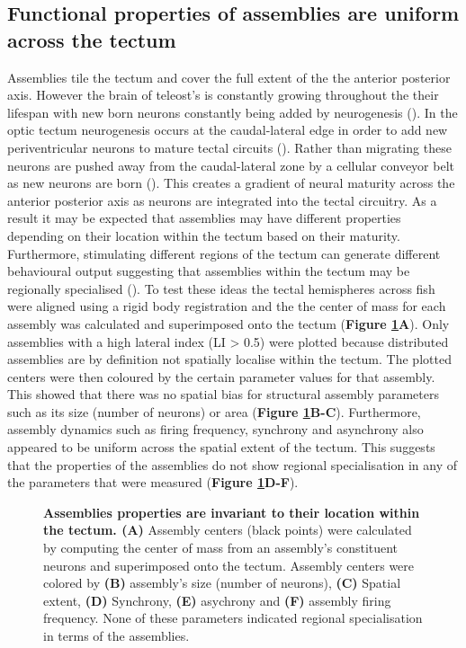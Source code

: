 \subsection{Functional properties of assemblies are uniform across the tectum}
Assemblies tile the tectum and cover the full extent of the the anterior posterior axis. However the brain of teleost's is constantly growing throughout the their lifespan with new born neurons constantly being added by neurogenesis (\cite{Boulanger-Weill2019}). In the optic tectum neurogenesis occurs at the caudal-lateral edge in order to add new periventricular neurons to mature tectal circuits (\cite{Schmidt2013NeurogenesisAdult}). Rather than migrating these neurons are pushed away from the caudal-lateral zone by a cellular conveyor belt as new neurons are born (\cite{Boulanger-Weill2017}). This creates a gradient of neural maturity across the anterior posterior axis as neurons are integrated into the tectal circuitry. As a result it may be expected that assemblies may have different properties depending on their location within the tectum based on their maturity. Furthermore, stimulating different regions of the tectum can generate different behavioural output suggesting that assemblies within the tectum may be regionally specialised (\cite{Helmbrecht2018}). To test these ideas the tectal hemispheres across fish were aligned using a rigid body registration and the the center of mass for each assembly was calculated and superimposed onto the tectum (\textbf{Figure \ref{fig:R1_F7}A}).  Only assemblies with a high lateral index (LI > 0.5) were plotted because distributed assemblies are by definition not spatially localise within the tectum. The plotted centers were then coloured by the certain parameter values for that assembly. This showed that there was no spatial bias for structural assembly parameters such as its size (number of neurons) or area (\textbf{Figure \ref{fig:R1_F7}B-C}). Furthermore, assembly dynamics such as firing frequency, synchrony and asynchrony also appeared to be uniform across the spatial extent of the tectum. This suggests that the properties of the assemblies do not show regional specialisation in any of the parameters that were measured (\textbf{Figure \ref{fig:R1_F7}D-F}).

    \begin{figure}[!htb]
        \caption[\label{fig:R1_F7} \textbf{Assemblies properties are invariant to their location within the tectum.}]{\label{fig:R1_F7} \textbf{Assemblies properties are invariant to their location within the tectum. (A)} Assembly centers (black points) were calculated by computing the center of mass from an assembly's constituent neurons and superimposed onto the tectum. Assembly centers were colored by \textbf{(B)} assembly's size (number of neurons), \textbf{(C)} Spatial extent, \textbf{(D)} Synchrony, \textbf{(E)} asychrony and  \textbf{(F)} assembly firing frequency. None of these parameters indicated regional specialisation in terms of the assemblies.}
      \end{figure}
      
